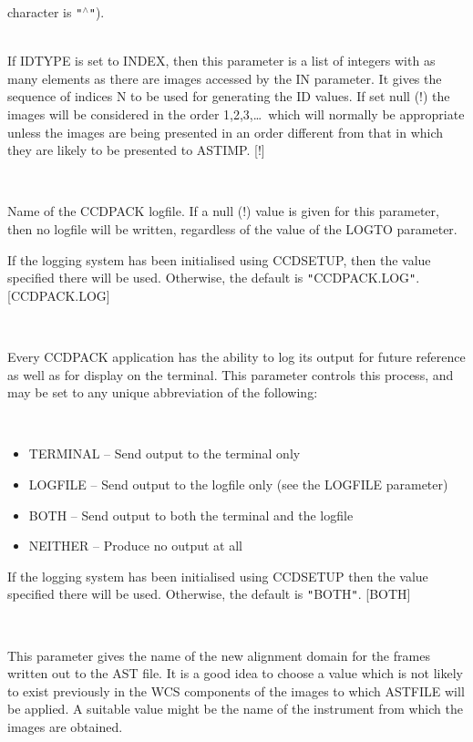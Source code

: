 \documentclass[twoside,11pt]{article}
\newcommand{\htmlref}[2]{#1}
\renewcommand{\_}{\texttt{\symbol{95}}}
\newcommand{\qt}[1]{{\tt "}#1{\tt "}}
\newcommand{\xroutine}[1]{\htmlref{{\sc #1}}{#1}}
\newcommand{\sstsubsection}[1]{ \item[{#1}] \mbox{} \\}
\newcommand{\sstitemlist}[1]{
  \mbox{} \\
  \vspace{-3.5ex}
  \begin{itemize}
     #1
  \end{itemize}
}
\newcommand{\sstitem}{\item}
\newcommand{\sstsubsection}[1]{\item[{#1}]}
\newcommand{\sstitemlist}[1]{
      \begin{itemize}
         #1
      \end{itemize}
      \\
   }
\newcommand{\sstitem}{\item}
\begin{document}
{{{          character is \qt{$^\wedge$}).
      }
      \sstsubsection{
          INDICES( ) = \_INTEGER (Read)
      } {
          If IDTYPE is set to INDEX, then this parameter is a list of
          integers with as many elements as there are images accessed by
          the IN parameter.  It gives the sequence of indices N to be
          used for generating the ID values.   If set null (!) the
          images will be considered in the order 1,2,3,\ldots\ which will
          normally be appropriate unless the images are being presented
          in an order different from that in which they are likely to
          be presented to \xroutine{ASTIMP}.
          [!]
      }
      \sstsubsection{
         LOGFILE = FILENAME (Read)
      } {
         Name of the CCDPACK logfile.  If a null (!) value is given for
         this parameter, then no logfile will be written, regardless of
         the value of the LOGTO parameter.

         If the logging system has been initialised using \xroutine{CCDSETUP},
         then the value specified there will be used. Otherwise, the
         default is \qt{CCDPACK.LOG}.
         [CCDPACK.LOG]
      }
      \sstsubsection{
         LOGTO = LITERAL (Read)
      } {
         Every CCDPACK application has the ability to log its output
         for future reference as well as for display on the terminal.
         This parameter controls this process, and may be set to any
         unique abbreviation of the following:
         \sstitemlist{

            \sstitem
               TERMINAL  -- Send output to the terminal only

            \sstitem
               LOGFILE   -- Send output to the logfile only (see the
                               LOGFILE parameter)

            \sstitem
               BOTH      -- Send output to both the terminal and the
                               logfile

            \sstitem
               NEITHER   -- Produce no output at all

         }
         If the logging system has been initialised using \xroutine{CCDSETUP}
         then the value specified there will be used. Otherwise, the
         default is \qt{BOTH}.
         [BOTH]
      }
      \sstsubsection{
         OUTDOMAIN = LITERAL (Read)
      }{
         This parameter gives the name of the new alignment domain for
         the frames written out to the AST file.  It is a good idea
         to choose a value which is not likely to exist previously
         in the WCS components of the images to which ASTFILE will be
         applied.  A suitable value might be the name of the
         instrument from which the images are obtained.

}}}
\end{document}

